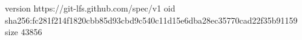 version https://git-lfs.github.com/spec/v1
oid sha256:fc281f214f1820cbb85d93cbd9c540c11d15e6dba28ec35770cad22f35b91159
size 43856
